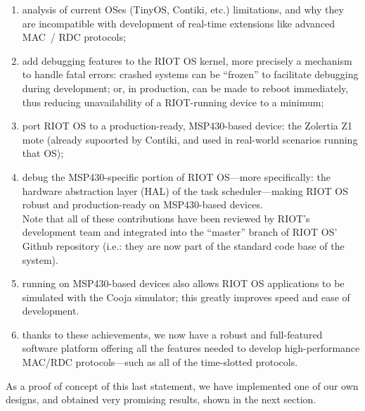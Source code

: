 \documentclass[a4paper,twoside]{article}
\begin{document}
\begin{enumerate}

\item analysis of current OSes (TinyOS, Contiki, etc.) limitations,
      and why they are incompatible with development of real-time
      extensions like advanced MAC~/ RDC protocols;

\item add debugging features to the RIOT OS kernel, more precisely
      a mechanism to handle fatal errors: crashed systems can be
      ``frozen'' to facilitate debugging during development; or,
      in production, can be made to reboot immediately, thus reducing
      unavailability of a RIOT-running device to a minimum;

\item port RIOT OS to a production-ready, MSP430-based device:
      the Zolertia Z1 mote (already supoorted by Contiki,
      and used in real-world scenarios running that OS);

\item debug the MSP430-specific portion of RIOT OS---more specifically:
      the hardware abstraction layer (HAL) of the task scheduler---making
      RIOT OS robust and production-ready on MSP430-based devices.\\
      Note that all of  these contributions have been reviewed by RIOT's
      development team and integrated into the ``master'' branch of RIOT OS'
      Github repository (i.e.: they are now part of the standard code base of
      the system).

\item running on MSP430-based devices also allows RIOT OS applications
      to be simulated with the Cooja simulator; this greatly improves
      speed and ease of development.

\item thanks to these achievements, we now have a robust and full-featured
      software platform offering all the features needed to develop
      high-performance MAC/RDC protocols---such as all of the time-slotted
      protocols.

\end{enumerate}

As a proof of concept of this last statement, we have implemented one
of our own designs, and obtained very promising results, shown in
the next section.

\end{document}
